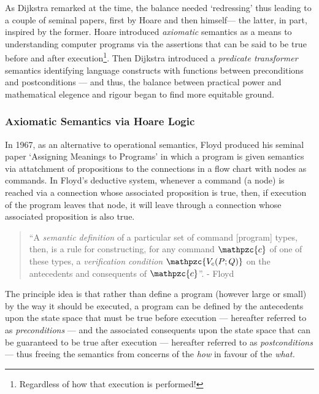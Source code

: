 \documentclass[oneside,12pt]{article}
\newcommand{\textM}[1]{\ensuremath{\mathpzc{#1}}}
\begin{document}
As Dijkstra remarked at the time, the balance needed `redressing' thus leading to a couple of seminal papers, first by Hoare\cite{hoare1969axiomatic} and then himself\cite{Dijkstra75}--- the latter, in part, inspired by the former. Hoare introduced \emph{axiomatic} semantics as a means to understanding computer programs via the assertions that can be said to be true before and after execution\footnote{Regardless of how that execution is performed!}. Then Dijkstra introduced a \emph{predicate transformer} semantics identifying language constructs with functions between preconditions and postconditions --- and thus, the balance between practical power and mathematical elegence and rigour began to find more equitable ground.



\subsubsection{Axiomatic Semantics via Hoare Logic}


In 1967, as an alternative to operational semantics, Floyd\cite{Floyd1967Flowcharts} produced his seminal paper `Assigning Meanings to Programs' in which a program is given semantics via attatchment of propositions to the connections in a flow chart with nodes as commands. In Floyd's deductive system, whenever a command (a node) is reached via a connection whose associated proposition is true, then, if execution of the program leaves that node, it will leave through a connection whose associated proposition is also true.

\begin{quote}

``A \emph{semantic definition} of a particular set of command [program] types, then, is a rule for constructing, for any command \textM{c} of one of these types, a \emph{verification condition} \textM{V_c(P;Q)} on the antecedents and consequents of \textM{c}''. - \footnotesize Floyd\cite{Floyd1967Flowcharts}

\end{quote}

The principle idea is that rather than define a program (however large or small) by the way it should be executed, a program can be defined by the antecedents upon the state space that must be true before execution --- hereafter referred to as \emph{preconditions} --- and the associated consequents upon the state space that can be guaranteed to be true after execution --- hereafter referred to as \emph{postconditions} --- thus freeing the semantics from concerns of the \emph{how} in favour of the \emph{what.}
\end{document}
